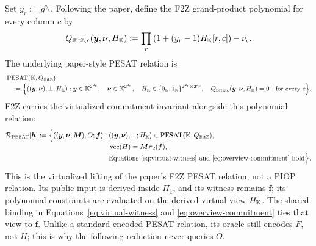 Set $y_r:=g^{\gamma_r}$.  Following the paper, define the F2Z grand-product
polynomial for every column $c$ by
\begin{equation}
 Q_{\mathbb{B}\mathrm{it}\mathbb{Z},c}
   (\bm y,\bm\nu,H_{\mathbb K})
 :=\prod_r\left(1+
       (y_r-1)H_{\mathbb K}[r,c]\right)
   -\nu_c.
 \label{eq:f2z-pesat-polynomial}
\end{equation}
The underlying paper-style PESAT relation is
\begin{align}
 &\operatorname{PESAT}
   (\mathbb K,Q_{\mathbb{B}\mathrm{it}\mathbb{Z}})
 \notag\\[-2pt]
 &\quad:=
 \Bigl\{((\bm y,\bm\nu),\bot;H_{\mathbb K}):
 \bm y\in\mathbb K^{2^{d_r}},\quad
 \bm\nu\in\mathbb K^{2^{d_c}},\quad
 H_{\mathbb K}\in\{0_{\mathbb K},1_{\mathbb K}\}^{2^{d_r}\times2^{d_c}},\quad
 Q_{\mathbb{B}\mathrm{it}\mathbb{Z},c}
   (\bm y,\bm\nu,H_{\mathbb K})=0
 \quad\text{for every }c\Bigr\}.
 \label{eq:paper-pesat-relation}
\end{align}
F2Z carries the virtualized commitment invariant alongside this polynomial
relation:
\begin{align}
 \mathcal R_{\rm PESAT}[\bm h]:=
 \Bigl\{((\bm y,\bm\nu,\bm M),O;\bm f):\;&
 ((\bm y,\bm\nu),\bot;H_{\mathbb K})
   \in\operatorname{PESAT}
   (\mathbb K,Q_{\mathbb{B}\mathrm{it}\mathbb{Z}}),\notag\\[-2pt]
 &\operatorname{vec}(H)=\bm M\pi_2(\bm f),\notag\\[-2pt]
 &\text{Equations~\eqref{eq:virtual-witness} and
   \eqref{eq:overview-commitment} hold}
 \Bigr\}.
 \label{eq:rel-pesat-h}
\end{align}
This is the virtualized lifting of the paper's F2Z PESAT relation, not a
PIOP relation.  Its public input is derived inside $\Pi_1$, and
its witness remains $\bm f$; its polynomial constraints are evaluated on the
derived virtual view $H_{\mathbb K}$.
The shared binding in Equations~\eqref{eq:virtual-witness} and
\eqref{eq:overview-commitment} ties that view to $\bm f$.
Unlike a standard encoded PESAT relation, its oracle still encodes $F$, not
$H$; this is why the following reduction never queries $O$.


